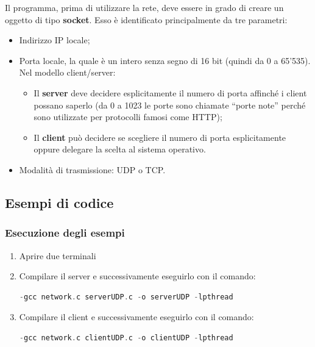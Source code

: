 \documentclass[a4paper]{article}
\newcommand{\dquotes}[1]{``#1''}
\begin{document}
	Il programma, prima di utilizzare la rete, deve essere in grado di creare un oggetto di tipo \textbf{socket}. Esso è identificato principalmente da tre parametri:
	\begin{itemize}
		\item Indirizzo IP locale;
		
		\item Porta locale, la quale è un intero senza segno di 16 bit (quindi da 0 a 65'535). Nel modello client/server:
		\begin{itemize}
			\item Il \textbf{server} deve decidere esplicitamente il numero di porta affinché i client possano saperlo (da 0 a 1023 le porte sono chiamate \dquotes{porte note} perché sono utilizzate per protocolli famosi come HTTP);
			
			\item Il \textbf{client} può decidere se scegliere il numero di porta esplicitamente oppure delegare la scelta al sistema operativo.
		\end{itemize}

		\item Modalità di trasmissione: UDP o TCP.
	\end{itemize}\newpage
	
	\subsection[\textcolor{Green4}{\textbf{Esempi}} di codice]{Esempi di codice}
	
	\subsubsection{Esecuzione degli esempi}
	
	\begin{enumerate}
		\item Aprire due terminali
		
		\item Compilare il server e successivamente eseguirlo con il comando:
		\begin{lstlisting}[language=C]
			-gcc network.c serverUDP.c -o serverUDP -lpthread\end{lstlisting}
		
		\item Compilare il client e successivamente eseguirlo con il comando:
		\begin{lstlisting}[language=C]
			-gcc network.c clientUDP.c -o clientUDP -lpthread\end{lstlisting}
	\end{enumerate}
\end{document}
